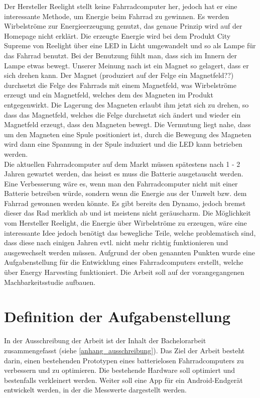 
Der Hersteller Reelight stellt keine Fahrradcomputer her, jedoch hat er eine interessante Methode, um Energie beim Fahrrad zu gewinnen. Es werden Wirbelströme zur Energieerzeugung genutzt, das genaue Prinzip wird auf der Homepage nicht erklärt. Die erzeugte Energie wird bei dem Produkt City Supreme von Reelight über eine LED in Licht umgewandelt und so als Lampe für das Fahrrad benutzt. Bei der Benutzung fühlt man, dass sich im Innern der Lampe etwas bewegt. Unserer Meinung nach ist ein Magnet so gelagert, dass er sich drehen kann. Der Magnet (produziert auf der Felge ein Magnetfeld??) durchsetzt die Felge des Fahrrads mit einem Magnetfeld, was Wirbelströme erzeugt und ein Magnetfeld, welches dem des Magneten im Produkt entgegenwirkt. Die Lagerung des Magneten erlaubt ihm jetzt sich zu drehen, so dass das Magnetfeld, welches die Felge durchsetzt sich ändert und wieder ein Magnetfeld erzeugt, dass den Magneten bewegt. Die Vermutung liegt nahe, dass um den Magneten eine Spule positioniert ist, durch die Bewegung des Magneten wird dann eine Spannung in der Spule induziert und die LED kann betrieben werden.\\

Die aktuellen Fahrradcomputer auf dem Markt müssen spätestens nach 1 - 2 Jahren gewartet werden, das heisst es muss die Batterie ausgetauscht werden. Eine Verbesserung wäre es, wenn man den Fahrradcomputer nicht mit einer Batterie betreiben würde, sondern wenn die Energie aus der Umwelt bzw. dem Fahrrad gewonnen werden könnte. Es gibt bereits den Dynamo, jedoch bremst dieser das Rad merklich ab und ist meistens nicht geräuscharm. Die Möglichkeit vom Hersteller Reelight, die Energie über Wirbelströme zu erzeugen, wäre eine interessante Idee jedoch benötigt das bewegliche Teile, welche problematisch sind, dass diese nach einigen Jahren evtl. nicht mehr richtig funktionieren und ausgewechselt werden müssen. Aufgrund der oben genannten Punkten wurde eine Aufgabenstellung für die Entwicklung eines Fahrradcomputers erstellt, welche über Energy Harvesting funktioniert. Die Arbeit soll auf der vorangegangenen Machbarkeitsstudie aufbauen.


\section{Definition der Aufgabenstellung}
In der Ausschreibung der Arbeit ist der Inhalt der Bachelorarbeit zusammengefasst (siehe \ref{anhang_ausschreibung}). Das Ziel der Arbeit besteht darin, einen bestehenden Prototypen eines batterielosen Fahrradcomputers zu verbessern und zu optimieren. Die bestehende Hardware soll optimiert und bestenfalls verkleinert werden. Weiter soll eine App für ein Android-Endgerät entwickelt werden, in der die Messwerte dargestellt werden.

